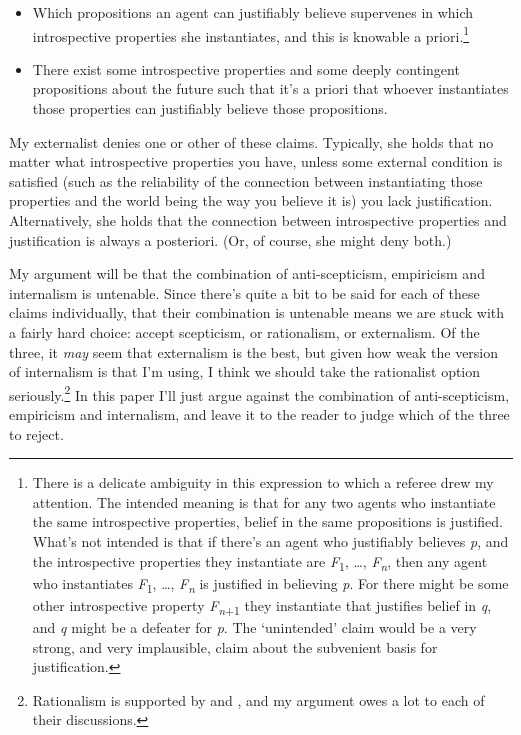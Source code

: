 \begin{itemize}
\item Which propositions an agent can justifiably believe supervenes in which introspective properties she instantiates, and this is knowable a priori.\footnote{There is a delicate ambiguity in this expression to which a referee drew my attention. The intended meaning is that for any two agents who instantiate the same introspective properties, belief in the same propositions is justified. What's not intended is that if there's an agent who justifiably believes \textit{p}, and the introspective properties they instantiate are \textit{F}\textsubscript{1}, {\dots}, \textit{F}\textit{\textsubscript{n}}, then any agent who instantiates \textit{F}\textsubscript{1}, {\dots}, \textit{F}\textit{\textsubscript{n}} is justified in believing \textit{p}. For there might be some other introspective property \textit{F}\textit{\textsubscript{n}}\textsubscript{+1} they instantiate that justifies belief in \textit{q}, and \textit{q} might be a defeater for \textit{p}. The `unintended' claim would be a very strong, and very implausible, claim about the subvenient basis for justification.}
\item There exist some introspective properties and some deeply contingent propositions about the future such that it's a priori that whoever instantiates those properties can justifiably believe those propositions.
\end{itemize}

\noindent My externalist denies one or other of these claims. Typically, she holds that no matter what introspective properties you have, unless some external condition is satisfied (such as the reliability of the connection between instantiating those properties and the world being the way you believe it is) you lack justification. Alternatively, she holds that the connection between introspective properties and justification is always a posteriori. (Or, of course, she might deny both.)

My argument will be that the combination of anti-scepticism, empiricism and internalism is untenable. Since there's quite a bit to be said for each of these claims individually, that their combination is untenable means we are stuck with a fairly hard choice: accept scepticism, or rationalism, or externalism. Of the three, it \textit{may }seem that externalism is the best, but given how weak the version of internalism is that I'm using, I think we should take the rationalist option seriously.\footnote{Rationalism is supported by \citet{Bonjour1997} and \citet{Hawthorne2002}, and my argument owes a lot to each of their discussions.} In this paper I'll just argue against the combination of anti-scepticism, empiricism and internalism, and leave it to the reader to judge which of the three to reject. 

